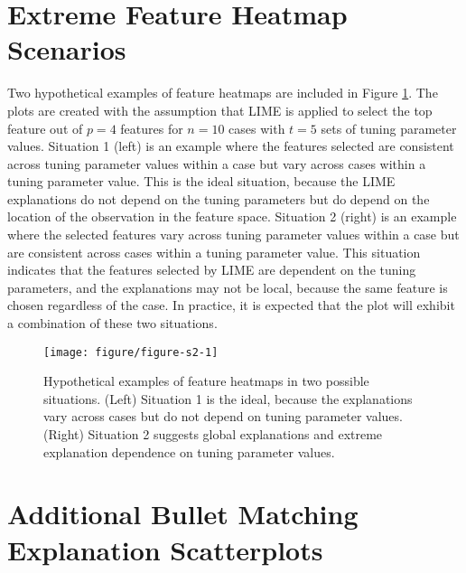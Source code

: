 \documentclass[9pt]{article}\usepackage[]{graphicx}\usepackage[]{color}
\newenvironment{knitrout}{}{} %
\begin{document}
\section{Extreme Feature Heatmap Scenarios}

Two hypothetical examples of feature heatmaps are included in Figure \ref{fig:figure-s2}. The plots are created with the assumption that LIME is applied to select the top feature out of $p=4$  features for $n=10$ cases with $t=5$ sets of tuning parameter values. Situation 1 (left) is an example where the features selected are consistent across tuning parameter values within a case but vary across cases within a tuning parameter value. This is the ideal situation, because the LIME explanations do not depend on the tuning parameters but do depend on the location of the observation in the feature space. Situation 2 (right) is an example where the selected features vary across tuning parameter values within a case but are consistent across cases within a tuning parameter value. This situation indicates that the features selected by LIME are dependent on the tuning parameters, and the explanations may not be  local, because the same feature is chosen regardless of the case. In practice, it is expected that the plot will exhibit a combination of these two situations.

\vspace{0.5cm}

\renewcommand{\thefigure}{S2}
\begin{figure}[!h]
\begin{knitrout}
\color{fgcolor}

{\centering \texttt{[image: figure/figure-s2-1]} 

}



\end{knitrout}
\caption{Hypothetical examples of feature heatmaps in two possible situations. (Left) Situation 1 is the ideal, because the explanations vary across cases but do not depend on tuning parameter values. (Right) Situation 2 suggests global explanations and extreme explanation dependence on tuning parameter values.}
\label{fig:figure-s2}
\end{figure}

\section{Additional Bullet Matching Explanation Scatterplots}
\end{document}
